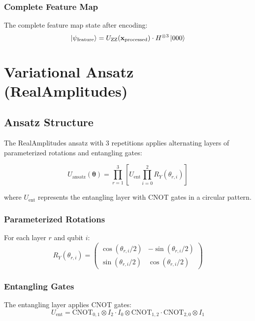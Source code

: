 \documentclass[12pt]{article}
\begin{document}
\subsubsection{Complete Feature Map}
The complete feature map state after encoding:
\begin{equation}
\ket{\psi_{\text{feature}}} = U_{\text{ZZ}}(\mathbf{x}_{\text{processed}}) \cdot H^{\otimes 3} \ket{000}
\end{equation}

\section{Variational Ansatz (RealAmplitudes)}

\subsection{Ansatz Structure}
The RealAmplitudes ansatz with 3 repetitions applies alternating layers of parameterized rotations and entangling gates:

\begin{equation}
U_{\text{ansatz}}(\boldsymbol{\theta}) = \prod_{r=1}^{3} \left[ U_{\text{ent}} \prod_{i=0}^{2} R_Y(\theta_{r,i}) \right]
\end{equation}

where $U_{\text{ent}}$ represents the entangling layer with CNOT gates in a circular pattern.

\subsubsection{Parameterized Rotations}
For each layer $r$ and qubit $i$:
\begin{equation}
R_Y(\theta_{r,i}) = \begin{pmatrix}
\cos(\theta_{r,i}/2) & -\sin(\theta_{r,i}/2) \\
\sin(\theta_{r,i}/2) & \cos(\theta_{r,i}/2)
\end{pmatrix}
\end{equation}

\subsubsection{Entangling Gates}
The entangling layer applies CNOT gates:
\begin{equation}
U_{\text{ent}} = \text{CNOT}_{0,1} \otimes I_2 \cdot I_0 \otimes \text{CNOT}_{1,2} \cdot \text{CNOT}_{2,0} \otimes I_1
\end{equation}
\end{document}
